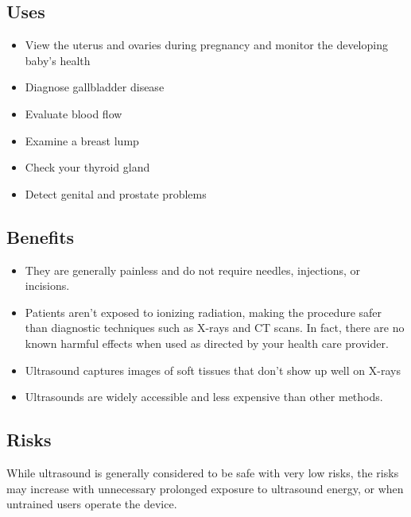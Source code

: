 \documentclass[12pt]{article}
\begin{document}
\subsection{Uses}
\begin{itemize}
\item View the uterus and ovaries during pregnancy and monitor the developing baby's health
\item Diagnose gallbladder disease
\item  Evaluate blood flow
\item  Examine a breast lump
\item  Check your thyroid gland
\item Detect genital and prostate problems
\end{itemize}
\subsection{Benefits}
\begin{itemize}
\item They are generally painless and do not require needles, injections, or incisions.
\item Patients aren't exposed to ionizing radiation, making the procedure safer than diagnostic techniques such as X-rays and CT scans. In fact, there are no known harmful effects when used as directed by your health care provider.
\item Ultrasound captures images of soft tissues that don't show up well on X-rays
\item Ultrasounds are widely accessible and less expensive than other methods.
\end{itemize}
\subsection{Risks}
While ultrasound is generally considered to be safe with very low risks, the risks may increase with unnecessary prolonged exposure to ultrasound energy, or when untrained users operate the device.
\end{document}

